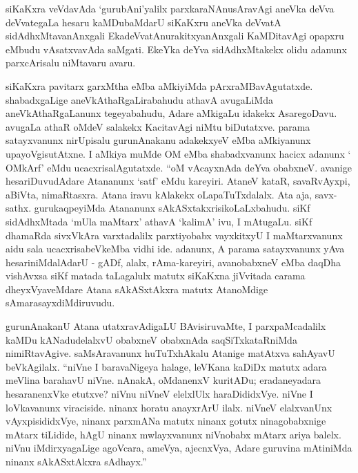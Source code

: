 siKaKxra veVdavAda `gurubAni'yalilx parxkaraNAnusAravAgi aneVka deVva deVvate\-gaLa hesaru kaMDubaMdarU siKaKxru aneVka deVvatA sidAdhxMtavanAnxgali EkadeVvatAnu\-rakitxyanAnxgali KaMDitavAgi opapxru eMbudu vAsatxvavAda saMgati. EkeYka deYva sidAdhxMtakekx olidu adanunx parxcArisalu niMtavaru avaru.

siKaKxra pavitarx garxMtha  eMba aMkiyiMda pArxraMBavAgutatxde. shabadxgaLige aneVkAthaRgaLirabahudu athavA avugaLiMda aneVkAthaRgaLanunx tegeyabahudu, Adare aMkigaLu idakekx AsaregoDavu. avugaLa athaR oMdeV salakekx KacitavAgi niMtu biDutatxve. parama satayxvanunx nirUpisalu gurunAnakanu adakekxyeV  eMba aMkiyanunx upayoVgisutAtxne. I aMkiya muMde OM eMba shabadxvanunx hacicx adanunx ` OMkArf' eMdu ucacxrisalAgutatxde. ``oM vAcayxnAda deYva obabxneV. avanige hesariDuvudAdare Atananunx `satf' eMdu kareyiri. AtaneV kataR, savaRvAyxpi, aBiVta, nimaRtasxra. Atana iravu kAlakekx oLapaTuTxdalalx. Ata aja, savx-sathx. gurukaqpeyiMda Atananunx sAkASxtakxrisikoLaLxbahudu. siKf sidAdhxMtada `mUla maMtarx' athavA `kalimA' ivu, I mAtugaLu. siKf dhamaRda sivxVkAra varxtadalilx parxtiyobabx vayxkitxyU I maMtarxvanunx aidu sala ucacxrisabeVkeMba vidhi ide. adanunx, A parama satayxvanunx yAva hesariniMdalAdarU - gADf, alalx, rAma-kareyiri, avanobabxneV eMba daqDha vishAvxsa siKf matada taLagalulx matutx siKaKxna jiVvitada carama dheyxVyaveMdare Atana sAkASxtAkxra matutx AtanoMdige sAmarasayxdiMdiruvudu.

gurunAnakanU Atana utatxravAdigaLU BAvisiruvaMte, I parxpaMcadalilx kaMDu kANadudelalxvU obabxneV obabxnAda saqSiTxkataRniMda nimiRtavAgive. saMsAravanunx huTuTxhAkalu Atanige matAtxva sahAyavU beVkAgilalx. ``niVne I baravaNigeya halage, leVKana kaDiDx matutx adara meVlina barahavU niVne. nAnakA, oMdanenxV kuritADu; eradaneyadara hesaranenxVke etutxve? niVnu niVneV elelxlUlx haraDididxVye. niVne I loVkavanunx viraciside. ninanx horatu anayxrArU ilalx. niVneV elalxvanUnx vAyxpisididxVye, ninanx parxmANa matutx ninanx gotutx ninagobabxnige mAtarx tiLidide, hAgU ninanx mwlayxvanunx niVnobabx mAtarx ariya balelx. niVnu iMdirxyagaLige agoVcara, ameVya, ajecnxVya, Adare guruvina mAtiniMda ninanx sAkASxtAkxra sAdhayx.''

